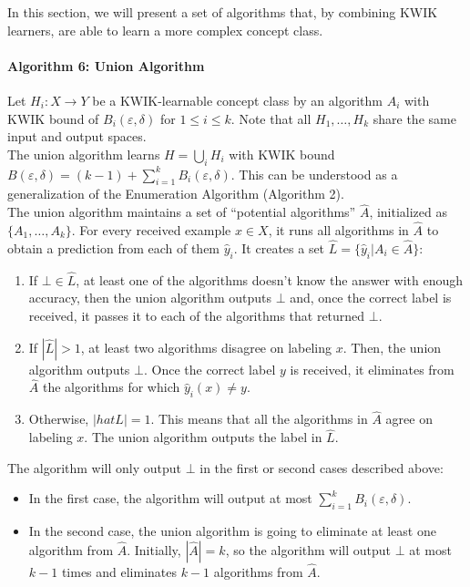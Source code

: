In this section, we will present a set of algorithms that, by combining KWIK
learners, are able to learn a more complex concept class. \\

\paragraph{Algorithm 6: Union Algorithm}
Let $H_i: X \to Y$ be a KWIK-learnable concept class by an algorithm $A_i$
with KWIK bound of $B_i(\varepsilon, \delta)$ for $1 \leq i \leq k$. Note that
all $H_1, \ldots, H_k$ share the same input and output spaces. \\

The union algorithm learns $H = \bigcup_i H_i$ with KWIK bound $B(\varepsilon,
\delta) = (k - 1) + \sum_{i = 1}^k B_i(\varepsilon, \delta)$. This can be
understood as a generalization of the Enumeration Algorithm (Algorithm 2). \\

The union algorithm maintains a set of ``potential algorithms'' $\hat{A}$,
initialized as $\{ A_1, \ldots, A_k \}$. For every received example
$x \in X$, it runs all algorithms in $\hat{A}$ to obtain a prediction from each
of them $\hat{y}_i$. It creates a set $\hat{L} = \{ \hat{y}_i | A_i \in \hat{A} \}$:
\begin{enumerate}
  \item If $\bot \in \hat{L}$, at least one of the algorithms doesn't know the
  answer with enough accuracy, then the union algorithm outputs $\bot$ and, once
  the correct label is received, it passes it to each of the algorithms that
  returned $\bot$.
  \item If $|\hat{L}| > 1$, at least two algorithms disagree on labeling $x$.
  Then, the union algorithm outputs $\bot$. Once the correct label $y$ is
  received, it eliminates from $\hat{A}$ the algorithms for which $\hat{y}_i(x)
  \neq y$.
  \item Otherwise, $|hat{L}| = 1$. This means that all the algorithms in
  $\hat{A}$ agree on labeling $x$. The union algorithm outputs the label in
  $\hat{L}$.
\end{enumerate}

The algorithm will only output $\bot$ in the first or second cases described
above:
\begin{itemize}
  \item In the first case, the algorithm will output at most $\sum_{i = 1}^k
  B_i(\varepsilon, \delta)$.
  \item In the second case, the union algorithm is going to eliminate at least one
  algorithm from $\hat{A}$. Initially, $|\hat{A}| = k$, so the algorithm will
  output $\bot$ at most $k - 1$ times and eliminates $k - 1$ algorithms from
  $\hat{A}$.
\end{itemize}

